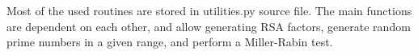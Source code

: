 Most of the used routines are stored in utilities.py source file. The main functions are dependent on each other, and allow generating RSA factors, generate random prime numbers in a given range, and perform a Miller-Rabin test\cite{bib:boreale}.


